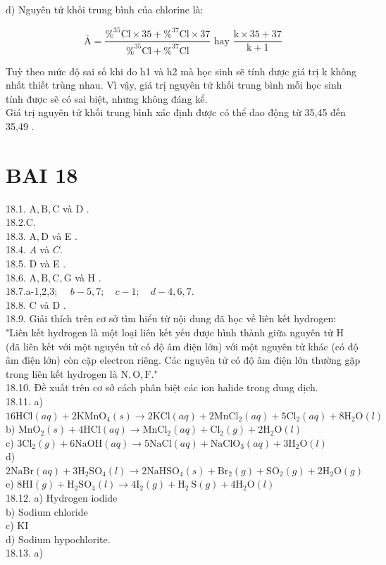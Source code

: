 \documentclass[10pt]{article}
\begin{document}
d) Nguyên tử khối trung bình của chlorine là:

$$
\overline{\mathrm{A}}=\frac{\%^{35} \mathrm{Cl} \times 35+\%^{37} \mathrm{Cl} \times 37}{\%^{35} \mathrm{Cl}+\%^{37} \mathrm{Cl}} \text { hay } \frac{\mathrm{k} \times 35+37}{\mathrm{k}+1}
$$

Tuỳ theo mức độ sai số khi đo h1 và h2 mà học sinh sẽ tính được giá trị k không nhất thiết trùng nhau. Vì vậy, giá trị nguyên tử khối trung bình mỗi học sinh tính được sẽ có sai biệt, nhưng không đáng kể.\\
Giá trị nguyên tử khối trung bình xác định được có thể dao động từ 35,45 đến 35,49 .

\section*{BAI 18}
18.1. $\mathrm{A}, \mathrm{B}, \mathrm{C}$ và D .\\
18.2.C.\\
18.3. $\mathrm{A}, \mathrm{D}$ và E .\\
18.4. $A$ và $C$.\\
18.5. D và E .\\
18.6. $\mathrm{A}, \mathrm{B}, \mathrm{C}, \mathrm{G}$ và H .\\
18.7.a-1,2,3; $\quad b-5,7 ; \quad c-1 ; \quad d-4,6,7$.\\
18.8. C và D .\\
18.9. Giải thích trên cơ sở tìm hiểu từ nội dung đã học về liên kết hydrogen: "Liên kết hydrogen là một loại liên kết yếu được hình thành giữa nguyên tử H (đã liên kết với một nguyên tử có độ âm điện lớn) với một nguyên tử khác (có độ âm điện lớn) còn cặp electron riêng. Các nguyên tử có độ âm điện lớn thường gặp trong liên kết hydrogen là $\mathrm{N}, \mathrm{O}, \mathrm{F}$."\\
18.10. Đề xuất trên cơ sở cách phân biệt các ion halide trong dung dịch.\\
18.11. a) $16 \mathrm{HCl}(a q)+2 \mathrm{KMnO}_{4}(s) \rightarrow 2 \mathrm{KCl}(a q)+2 \mathrm{MnCl}_{2}(a q)+5 \mathrm{Cl}_{2}(a q) +8 \mathrm{H}_{2} \mathrm{O}(l)$\\
b) $\mathrm{MnO}_{2}(s)+4 \mathrm{HCl}(a q) \rightarrow \mathrm{MnCl}_{2}(a q)+\mathrm{Cl}_{2}(g)+2 \mathrm{H}_{2} \mathrm{O}(l)$\\
c) $3 \mathrm{Cl}_{2}(g)+6 \mathrm{NaOH}(a q) \rightarrow 5 \mathrm{NaCl}(a q)+\mathrm{NaClO}_{3}(a q)+3 \mathrm{H}_{2} \mathrm{O}(l)$\\
d) $2 \mathrm{NaBr}(a q)+3 \mathrm{H}_{2} \mathrm{SO}_{4}(l) \rightarrow 2 \mathrm{NaHSO}_{4}(s)+\mathrm{Br}_{2}(g)+\mathrm{SO}_{2}(g)+2 \mathrm{H}_{2} \mathrm{O}(g)$\\
e) $8 \mathrm{HI}(g)+\mathrm{H}_{2} \mathrm{SO}_{4}(l) \rightarrow 4 \mathrm{I}_{2}(g)+\mathrm{H}_{2} \mathrm{~S}(g)+4 \mathrm{H}_{2} \mathrm{O}(l)$\\
18.12. a) Hydrogen iodide\\
b) Sodium chloride\\
c) KI\\
d) Sodium hypochlorite.\\
18.13. a)
\end{document}
